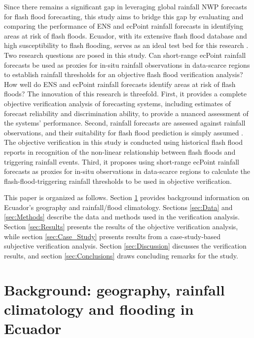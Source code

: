 \documentclass[techmemo]{ecmwfrep}%
\begin{document}
Since there remains a significant gap in leveraging global rainfall NWP forecasts for flash flood forecasting, this study aims to bridge this gap by evaluating and comparing the performance of ENS and ecPoint rainfall forecasts in identifying areas at risk of flash floods. Ecuador, with its extensive flash flood database and high susceptibility to flash flooding, serves as an ideal test bed for this research \citep{Kruczkiewicz2021a}. Two research questions are posed in this study. Can short-range ecPoint rainfall forecasts be used as proxies for in-situ rainfall observations in data-scarce regions to establish rainfall thresholds for an objective flash flood verification analysis? How well do ENS and ecPoint rainfall forecasts identify areas at risk of flash floods? The innovation of this research is threefold. First, it provides a complete objective verification analysis of forecasting systems, including estimates of forecast reliability and discrimination ability, to provide a nuanced assessment of the systems' performance. Second, rainfall forecasts are assessed against rainfall observations, and their suitability for flash flood prediction is simply assumed \citep{Gascon2023, Hewson2021}. The objective verification in this study is conducted using historical flash flood reports in recognition of the non-linear relationship between flash floods and triggering rainfall events. Third, it proposes using short-range ecPoint rainfall forecasts as proxies for in-situ observations in data-scarce regions to calculate the flash-flood-triggering rainfall thresholds to be used in objective verification. 

This paper is organized as follows. Section \ref{sec:Background} provides background information on Ecuador's geography and rainfall/flood climatology. Sections \ref{sec:Data} and \ref{sec:Methods} describe the data and methods used in the verification analysis. Section \ref{sec:Results} presents the results of the objective verification analysis, while section \ref{sec:Case_Study} presents results from a case-study-based subjective verification analysis. Section \ref{sec:Discussion} discusses the verification results, and section \ref{sec:Conclusions} draws concluding remarks for the study.



\section{Background: geography, rainfall climatology and flooding in Ecuador}
\label{sec:Background}
\end{document}
